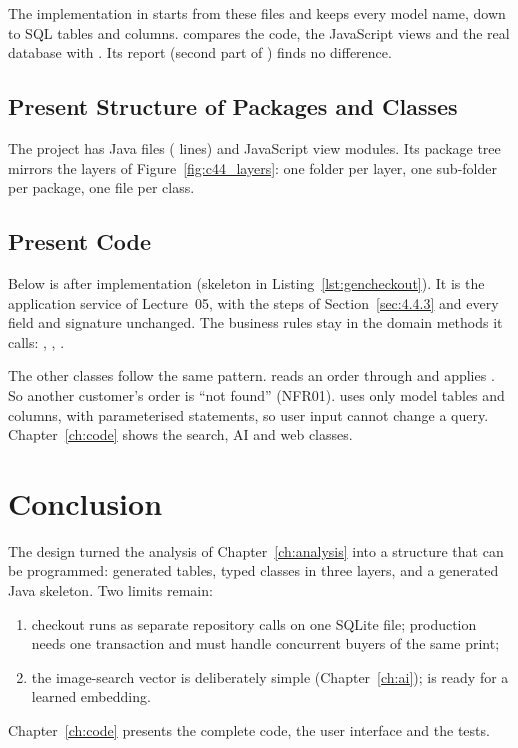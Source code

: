 The implementation in  starts from these files and keeps every model name, down to SQL
tables and columns.  compares the code, the JavaScript views and the real database
with . Its report (second part of ) finds no difference.

\subsection{Present Structure of Packages and Classes}\label{sec:4.5.2}

The project has \javaFileCount{} Java files (\javaLineCount{} lines) and \jsFileCount{} JavaScript view modules. Its
package tree mirrors the layers of Figure~\ref{fig:c44_layers}: one folder per layer, one sub-folder per package,
one file per class.


\subsection{Present Code}\label{sec:4.5.3}

Below is  after implementation (skeleton in Listing~\ref{lst:gencheckout}). It is the
application service of Lecture~05, with the steps of Section~\ref{sec:4.4.3} and every field and signature
unchanged. The business rules stay in the domain methods it calls: ,
, .


The other classes follow the same pattern.  reads an order through
 and applies . So another customer's order is ``not found''
(NFR01).  uses only model tables and columns, with parameterised statements, so user
input cannot change a query. Chapter~\ref{ch:code} shows the search, AI and web classes.

\section{Conclusion}\label{sec:4.6}

The design turned the analysis of Chapter~\ref{ch:analysis} into a structure that can be programmed:
\nTables{} generated tables, typed classes in three layers, and a generated Java skeleton. Two limits remain:
\begin{enumerate}
\item checkout runs as separate repository calls on one SQLite file; production needs one transaction and must
handle concurrent buyers of the same print;
\item the image-search vector is deliberately simple (Chapter~\ref{ch:ai});  is ready for a
learned embedding.
\end{enumerate}
Chapter~\ref{ch:code} presents the complete code, the user interface and the tests.
